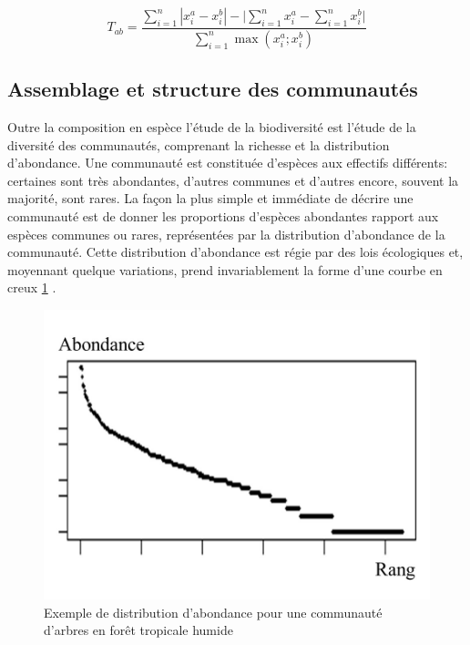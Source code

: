 \documentclass[
  11pt,
  french,
  A4paper,
  extrafontsizes,onecolumn,openright
  ]{memoir}
\begin{document}
\begin{equation}
T_{ab}=\frac{\sum_{i=1}^{n}|x_i^a - x_i^b| - \bigg| \sum_{i=1}^{n}{x_i^a} - \sum_{i=1}^{n}{x_i^b} \bigg|}{\sum_{i=1}^{n}\max{\left( x_i^a;x_i^b \right)}}
\label{eq:formNestedness}
\end{equation}

\subsection{Assemblage et structure des
communautés}\label{assemblage-et-structure-des-communautes}

Outre la composition en espèce l'étude de la biodiversité est l'étude de
la diversité des communautés, comprenant la richesse et la distribution
d'abondance. Une communauté est constituée d'espèces aux effectifs
différents: certaines sont très abondantes, d'autres communes et
d'autres encore, souvent la majorité, sont rares. La façon la plus
simple et immédiate de décrire une communauté est de donner les
proportions d'espèces abondantes rapport aux espèces communes ou rares,
représentées par la distribution d'abondance de la communauté. Cette
distribution d'abondance est régie par des lois écologiques et,
moyennant quelque variations, prend invariablement la forme d'une courbe
en creux \ref{fig:AbdDist} \autocite{McGill2007}.

\begin{figure}

{\centering \includegraphics[width=0.6\linewidth]{ExternalFig/SpeciesAbdDist} 

}

\caption{Exemple de distribution d'abondance pour une communauté d'arbres en forêt tropicale humide}\label{fig:AbdDist}
\end{figure}
\end{document}
